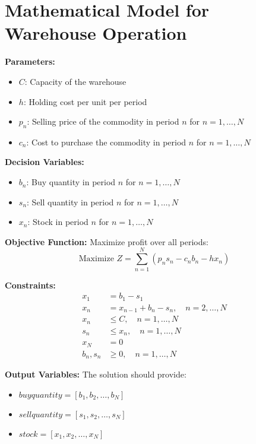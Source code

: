 \documentclass{article}
\begin{document}
\section*{Mathematical Model for Warehouse Operation}

\textbf{Parameters:}
\begin{itemize}
    \item $C$: Capacity of the warehouse
    \item $h$: Holding cost per unit per period
    \item $p_n$: Selling price of the commodity in period $n$ for $n = 1, \ldots, N$
    \item $c_n$: Cost to purchase the commodity in period $n$ for $n = 1, \ldots, N$
\end{itemize}

\textbf{Decision Variables:}
\begin{itemize}
    \item $b_n$: Buy quantity in period $n$ for $n = 1, \ldots, N$
    \item $s_n$: Sell quantity in period $n$ for $n = 1, \ldots, N$
    \item $x_n$: Stock in period $n$ for $n = 1, \ldots, N$
\end{itemize}

\textbf{Objective Function:}
Maximize profit over all periods:
\[
\text{Maximize } Z = \sum_{n=1}^{N} (p_n s_n - c_n b_n - h x_n)
\]

\textbf{Constraints:}
\begin{align*}
    x_1 & = b_1 - s_1 \\
    x_n & = x_{n-1} + b_n - s_n, \quad n = 2, \ldots, N \\
    x_n & \leq C, \quad n = 1, \ldots, N \\
    s_n & \leq x_n, \quad n = 1, \ldots, N \\
    x_N & = 0 \\
    b_n, s_n & \geq 0, \quad n = 1, \ldots, N
\end{align*}

\textbf{Output Variables:}
The solution should provide:
\begin{itemize}
    \item $buyquantity = [b_1, b_2, \ldots, b_N]$
    \item $sellquantity = [s_1, s_2, \ldots, s_N]$
    \item $stock = [x_1, x_2, \ldots, x_N]$
\end{itemize}
\end{document}

